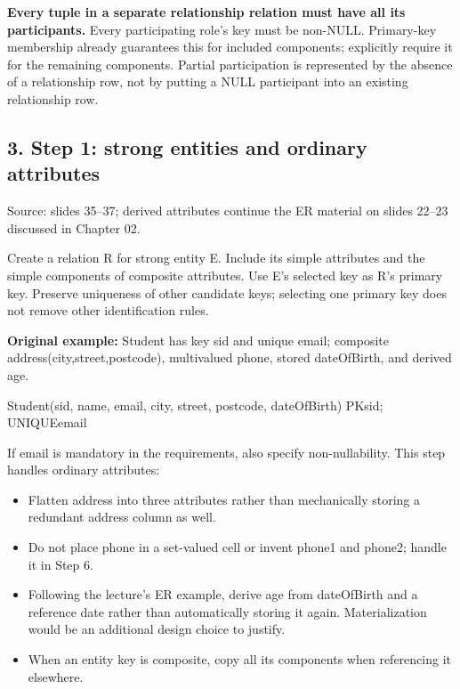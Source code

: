 \textbf{Every tuple in a separate relationship relation must have all its participants.} Every participating role's key must be non-NULL. Primary-key membership already guarantees this for included components; explicitly require it for the remaining components. Partial participation is represented by the absence of a relationship row, not by putting a NULL participant into an existing relationship row.

\subsection{3. Step 1: strong entities and ordinary attributes}\label{04_er_to_relational_mapping_en-step-1-strong-entities-and-ordinary-attributes}

Source: slides 35--37; derived attributes continue the ER material on slides 22--23 discussed in Chapter 02.

Create a relation R for strong entity E. Include its simple attributes and the simple components of composite attributes. Use E's selected key as R's primary key. Preserve uniqueness of other candidate keys; selecting one primary key does not remove other identification rules.

\textbf{Original example:} Student has key sid and unique email; composite address(city,street,postcode), multivalued phone, stored dateOfBirth, and derived age.

\begin{StudyCode}
Student(sid, name, email, city, street, postcode, dateOfBirth)
PK{sid}; UNIQUE{email}
\end{StudyCode}

If email is mandatory in the requirements, also specify non-nullability. This step handles ordinary attributes:

\begin{itemize}
\tightlist
\item
  Flatten address into three attributes rather than mechanically storing a redundant address column as well.
\item
  Do not place phone in a set-valued cell or invent phone1 and phone2; handle it in Step 6.
\item
  Following the lecture's ER example, derive age from dateOfBirth and a reference date rather than automatically storing it again. Materialization would be an additional design choice to justify.
\item
  When an entity key is composite, copy all its components when referencing it elsewhere.
\end{itemize}

